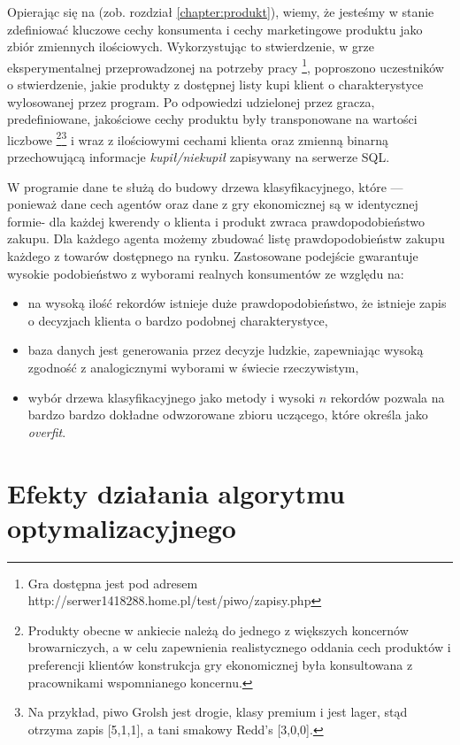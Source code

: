 \documentclass[polish, twoside, 12pt, a4paper]{article}
\theoremstyle{definition}
\theoremstyle{plain}
\theoremstyle{remark}
\begin{document}
Opierając się na \cite{Sagan2011} (zob. rozdział \ref{chapter:produkt}), wiemy, że jesteśmy w stanie zdefiniować kluczowe cechy konsumenta i cechy marketingowe produktu jako zbiór zmiennych ilościowych. Wykorzystując to stwierdzenie, w grze eksperymentalnej przeprowadzonej na potrzeby pracy \footnote{Gra dostępna jest pod adresem http://serwer1418288.home.pl/test/piwo/zapisy.php}, poproszono uczestników o stwierdzenie, jakie produkty z dostępnej listy kupi klient o charakterystyce wylosowanej przez program. Po odpowiedzi udzielonej przez gracza, predefiniowane, jakościowe cechy produktu były transponowane na wartości liczbowe \footnote{Produkty obecne w ankiecie należą do jednego z większych koncernów browarniczych, a w celu zapewnienia realistycznego oddania cech produktów i preferencji klientów konstrukcja gry ekonomicznej była konsultowana z pracownikami wspomnianego koncernu.}\footnote{Na przykład, piwo Grolsh jest drogie, klasy premium i jest lager, stąd otrzyma zapis [5,1,1], a tani smakowy Redd's [3,0,0].} i wraz z ilościowymi cechami klienta oraz zmienną binarną przechowującą informacje \textit{kupił/niekupił} zapisywany na serwerze SQL. 

W programie dane te służą do budowy drzewa klasyfikacyjnego, które --- ponieważ dane cech agentów oraz dane z gry ekonomicznej są w identycznej formie- dla każdej kwerendy o klienta i produkt zwraca prawdopodobieństwo zakupu. Dla każdego agenta możemy zbudować listę prawdopodobieństw zakupu każdego z towarów dostępnego na rynku. Zastosowane podejście gwarantuje wysokie podobieństwo z wyborami realnych konsumentów ze względu na:

	\begin{itemize}
		\item na wysoką ilość rekordów istnieje duże prawdopodobieństwo, że istnieje zapis o decyzjach klienta o bardzo podobnej charakterystyce,
		\item baza danych jest generowania przez decyzje ludzkie, zapewniając wysoką zgodność z analogicznymi wyborami w świecie rzeczywistym,
		\item wybór drzewa klasyfikacyjnego  jako metody i wysoki $n$ rekordów pozwala na bardzo bardzo dokładne odwzorowane zbioru uczącego, które \cite{James2013} określa jako \textit{overfit}. 
	\end{itemize}

\clearpage
\section{Efekty działania algorytmu optymalizacyjnego}
\end{document}
